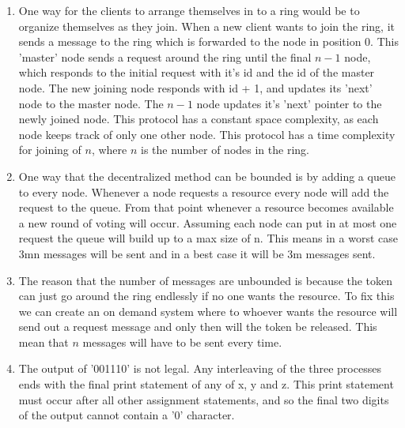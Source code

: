 \documentclass{article}
\begin{document}
\begin{enumerate}
	\item

One way for the clients to arrange themselves in to a ring would be to organize themselves as they join. When a new client wants to join the ring, it sends a message to the ring which is forwarded to the node in position 0. This 'master' node sends a request around the ring until the final \(n-1\) node, which responds to the initial request with it's id and the id of the master node. The new joining node responds with id + 1, and updates its 'next' node to the master node. The \(n-1\) node updates it's 'next' pointer to the newly joined node. This protocol has a constant space complexity, as each node keeps track of only one other node. This protocol has a time complexity for joining of \(n\), where \(n\) is the number of nodes in the ring.

	\item
	
One way that the decentralized method can be bounded is by adding a queue to every node. Whenever a node requests a resource every node will add the request to the queue. From that point whenever a resource becomes available a new round of voting will occur. Assuming each node can put in at most one request the queue will build up to a max size of n. This means in a worst case 3mn messages will be sent and in a best case it will be 3m messages sent.

	\item

The reason that the number of messages are unbounded is because the token can just go around the ring endlessly if no one wants the resource. To fix this we can create an on demand system where to whoever wants the resource will send out a request message and only then will the token be released. This mean that \(n\) messages will have to be sent every time.

	\item

The output of '001110' is not legal. Any interleaving of the three processes ends with the final print statement of any of x, y and z. This print statement must occur after all other assignment statements, and so the final two digits of the output cannot contain a '0' character.

\end{enumerate}
\end{document}
